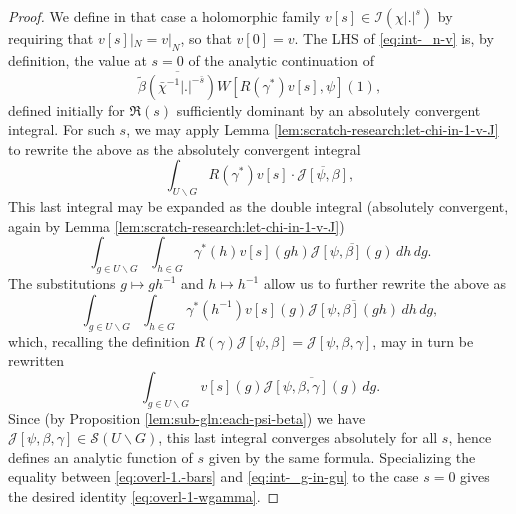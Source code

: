 \documentclass[reqno]{amsart}
\theoremstyle{plain} \newtheorem{theorem} {Theorem}
\theoremstyle{definition} \newtheorem{definition} [theorem] {Definition}
\theoremstyle{itplain} %
\numberwithin{equation}{section}
\numberwithin{theorem}{section}
\begin{document}
\begin{proof}
We define in that case a holomorphic family $v[s] \in \mathcal{I}(\chi |.|^s)$ by requiring that $v[s]|_{N} = v|_N$, so that $v[0] = v$.  The LHS of \eqref{eq:int-_n-v} is, by definition, the value at $s = 0$ of the analytic continuation of
\begin{equation}\label{eq:overl-1.-bars}
    \overline{\tilde{\beta}(\bar{\chi}^{-1}|.|^{-\bar{s}})}
    W[R(\gamma^*) v[s], \psi](1),
  \end{equation}
  defined initially for $\Re(s)$ sufficiently dominant by an absolutely convergent integral.  For such $s$, we may apply Lemma \ref{lem:scratch-research:let-chi-in-1-v-J} to rewrite the above as the absolutely convergent integral
  \begin{equation*}
    \int _{U \backslash G}
    R(\gamma^*) v[s] \cdot
    \overline{\mathcal{J}[\psi,\beta]},
  \end{equation*}
  This last integral may be expanded as the double integral (absolutely convergent, again by Lemma \ref{lem:scratch-research:let-chi-in-1-v-J})
  \begin{equation*}
    \int _{g \in U \backslash G}
    \int _{h \in G} \gamma^*(h)
    v[s](g h) \overline{\mathcal{J}[\psi,\beta](g)} \, d h \, d g.
  \end{equation*}
  The substitutions $g \mapsto g h^{-1}$  and $h \mapsto h^{-1}$ allow us to further rewrite the above as
  \begin{equation*}
    \int _{g \in U \backslash G}
    \int _{h \in G} \gamma^*(h^{-1})
    v[s](g) \overline{\mathcal{J}[\psi,\beta](g h)} \, d h \, d g,
  \end{equation*}
  which, recalling the definition $R(\gamma) \mathcal{J}[\psi,\beta] = \mathcal{J}[\psi,\beta,\gamma]$, may in turn be rewritten
  \begin{equation}\label{eq:int-_g-in-gu}
    \int _{g \in U \backslash G}
    v[s](g) \overline{\mathcal{J}[\psi,\beta,\gamma](g)} \, d g.
  \end{equation}
  Since (by Proposition \ref{lem:sub-gln:each-psi-beta}) we have $\mathcal{J}[\psi,\beta,\gamma] \in \mathcal{S}(U \backslash G)$, this last integral converges absolutely for all $s$, hence defines an analytic function of $s$ given by the same formula.  Specializing the equality between \eqref{eq:overl-1.-bars} and \eqref{eq:int-_g-in-gu} to the case $s = 0$ gives the desired identity \eqref{eq:overl-1-wgamma}.
\end{proof}
\end{document}
